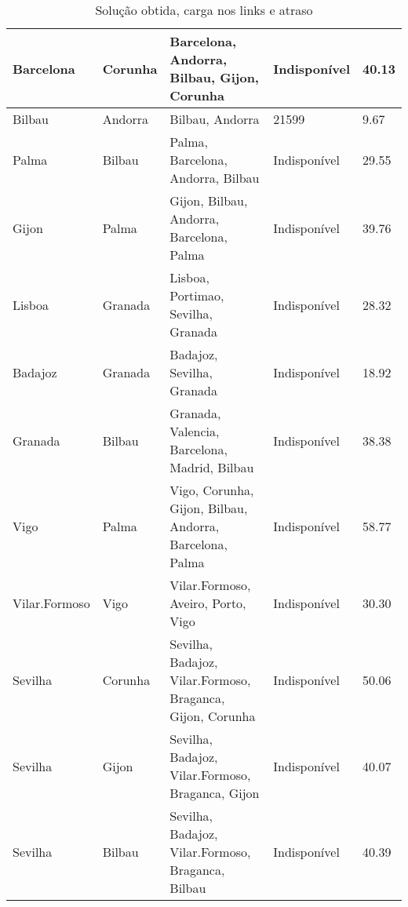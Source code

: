\begin{table}[!htb]
{\begin{tabular}{|l|l|l|l|l|}
Barcelona & Corunha & Barcelona, Andorra, Bilbau, Gijon, Corunha & Indisponível & 40.13 \\ \hline
Bilbau & Andorra & Bilbau, Andorra & 21599 & 9.67 \\ \hline
Palma & Bilbau & Palma, Barcelona, Andorra, Bilbau & Indisponível & 29.55 \\ \hline
Gijon & Palma & Gijon, Bilbau, Andorra, Barcelona, Palma & Indisponível & 39.76 \\ \hline
Lisboa & Granada & Lisboa, Portimao, Sevilha, Granada & Indisponível & 28.32 \\ \hline
Badajoz & Granada & Badajoz, Sevilha, Granada & Indisponível & 18.92 \\ \hline
Granada & Bilbau & Granada, Valencia, Barcelona, Madrid, Bilbau & Indisponível & 38.38 \\ \hline
Vigo & Palma & Vigo, Corunha, Gijon, Bilbau, Andorra, Barcelona, Palma & Indisponível & 58.77 \\ \hline
Vilar.Formoso & Vigo & Vilar.Formoso, Aveiro, Porto, Vigo & Indisponível & 30.30 \\ \hline
Sevilha & Corunha & Sevilha, Badajoz, Vilar.Formoso, Braganca, Gijon, Corunha & Indisponível & 50.06 \\ \hline
Sevilha & Gijon & Sevilha, Badajoz, Vilar.Formoso, Braganca, Gijon & Indisponível & 40.07 \\ \hline
Sevilha & Bilbau & Sevilha, Badajoz, Vilar.Formoso, Braganca, Bilbau & Indisponível & 40.39 \\ \hline
\end{tabular}}
\caption[]{Solução obtida, carga nos links e atraso}
\end{table}

